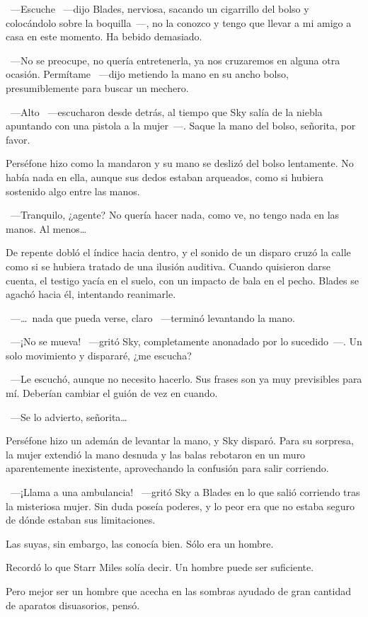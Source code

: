 ~---Escuche ~---dijo Blades, nerviosa, sacando un cigarrillo del bolso y colocándolo sobre la boquilla~---, no la conozco y tengo que llevar a mi amigo a casa en este momento. Ha bebido demasiado.

~---No se preocupe, no quería entretenerla, ya nos cruzaremos en alguna otra ocasión. Permítame ~---dijo metiendo la mano en su ancho bolso, presumiblemente para buscar un mechero.

~---Alto ~---escucharon desde detrás, al tiempo que Sky salía de la niebla apuntando con una pistola a la mujer~---. Saque la mano del bolso, señorita, por favor.

Perséfone hizo como la mandaron y su mano se deslizó del bolso lentamente. No había nada en ella, aunque sus dedos estaban arqueados, como si hubiera sostenido algo entre las manos.

~---Tranquilo, ¿agente? No quería hacer nada, como ve, no tengo nada en las manos. Al menos\dots

De repente dobló el índice hacia dentro, y el sonido de un disparo cruzó la calle como si se hubiera tratado de una ilusión auditiva. Cuando quisieron darse cuenta, el testigo yacía en el suelo, con un impacto de bala en el pecho. Blades se agachó hacia él, intentando reanimarle.

~---\dots\ nada que pueda verse, claro ~---terminó levantando la mano.

~---¡No se mueva! ~---gritó Sky, completamente anonadado por lo sucedido~---. Un solo movimiento y dispararé, ¿me escucha?

~---Le escuchó, aunque no necesito hacerlo. Sus frases son ya muy previsibles para mí. Deberían cambiar el guión de vez en cuando.

~---Se lo advierto, señorita\dots

Perséfone hizo un ademán de levantar la mano, y Sky disparó. Para su sorpresa, la mujer extendió la mano desnuda y las balas rebotaron en un muro aparentemente inexistente, aprovechando la confusión para salir corriendo.

~---¡Llama a una ambulancia! ~---gritó Sky a Blades en lo que salió corriendo tras la misteriosa mujer. Sin duda poseía poderes, y lo peor era que no estaba seguro de dónde estaban sus limitaciones.

Las suyas, sin embargo, las conocía bien. Sólo era un hombre.

Recordó lo que Starr Miles solía decir. Un hombre puede ser suficiente.

Pero mejor ser un hombre que acecha en las sombras ayudado de gran cantidad de aparatos disuasorios, pensó.

